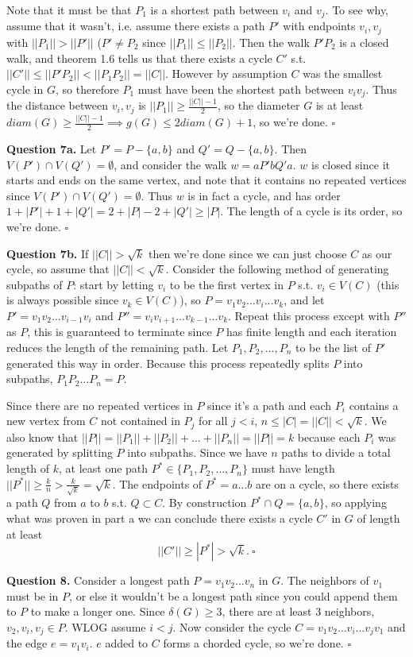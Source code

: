 \documentclass[letterpaper, reqno,11pt]{article}
\begin{document}
Note that it must be that $P_1$ is a shortest path between $v_i$ and $v_j$. To see why, assume that it wasn't, i.e. assume there exists a path $P'$ with endpoints $v_i, v_j$ with $| |P_1| |> | |P'| |$ ($P'\neq P_2$ since $| |P_1| |\leq | |P_2| |$. Then the walk $P'P_2$ is a closed walk, and theorem 1.6 tells us that there exists a cycle $C'$ s.t. $| |C'| |\leq | |P'P_2| |<| |P_1P_2| |=| |C| |$. However by assumption $C$ was the smallest cycle in $G$, so therefore $P_1$ must have been the shortest path between $v_iv_j$. Thus the distance between $v_i,v_j$ is $| |P_1| |\geq \frac{| |C| |-1}{2}$, so the diameter $G$ is at least $diam(G)\geq \frac{| |C| |-1}{2}\implies g(G)\leq 2diam(G)+1$, so we're done. $\square$

{\medskip\noindent\bf Question 7a.} Let $P'=P-\{a,b\} $ and $Q'=Q-\{a,b\} $. Then $V(P')\cap V(Q')=\emptyset$, and consider the walk $w=aP'bQ'a$. $w$ is closed since it starts and ends on the same vertex, and note that it contains no repeated vertices since $V(P')\cap V(Q')=\emptyset$. Thus $w$ is in fact a cycle, and has order $1 + |P'| + 1 + |Q'|=2 + |P|-2+|Q'|\geq |P| $. The length of a cycle is its order, so we're done. $\square$

{\medskip\noindent\bf Question 7b.} If $| |C| |> \sqrt{k} $ then we're done since we can just choose $C$ as our cycle, so assume that $| |C| |< \sqrt{k} $. Consider the following method of generating subpaths of $P$: start by letting $v_i$ to be the first vertex in $P$ s.t. $v_i\in V(C)$ (this is always possible since $v_k\in V(C)$), so $P=v_1v_2\ldots v_i\ldots v_k$, and let $P'=v_1v_2\ldots v_{i-1}v_{i}$ and $P''=v_{i}v_{i+1}\ldots v_{k-1}\ldots v_{k}$. Repeat this process except with $P''$ as $P$, this is guaranteed to terminate since $P$ has finite length and each iteration reduces the length of the remaining path. Let $P_1, P_2, \ldots, P_n$ to be the list of $P'$ generated this way in order. Because this process repeatedly splits $P$ into subpaths, $P_1P_2\ldots P_n=P$.

Since there are no repeated vertices in $P$ since it's a path and each $P_i$ contains a new vertex from $C$ not contained in $P_j$ for all $j<i$, $n\leq |C|=| |C| |< \sqrt{k} $. We also know that $| |P| |=|| P_1| |+| |P_2| |+\ldots+| |P_n| |=| |P| |=k$ because each $P_i$ was generated by splitting $P$ into subpaths. Since we have $n$ paths to divide a total length of $k$, at least one path $P^*\in \{P_1, P_2, \ldots, P_n\} $ must have length $||P^*| |\geq\frac{k}{n}> \frac{k}{\sqrt{k} }=\sqrt{k} $. The endpoints of $P^*=a\ldots b$ are on a cycle, so there exists a path $Q$ from $a$ to $b$ s.t. $Q\subset C$. By construction $P^*\cap Q=\{a,b\}$, so applying what was proven in part a we can conclude there exists a cycle $C'$ in $G$ of length at least 
\[
| |C'| |\geq |P^*|> \sqrt{k}. \ \square 
\]

{\medskip\noindent\bf Question 8.} Consider a longest path $P=v_1v_2\ldots v_n$ in $G$. The neighbors of $v_1$ must be in $P$, or else it wouldn't be a longest path since you could append them to $P$ to make a longer one. Since $\delta(G)\geq 3$, there are at least $3$ neighbors, $v_2, v_i, v_j\in P$. WLOG assume $i<j$. Now consider the cycle $C=v_1v_2\ldots v_i\ldots v_jv_1$ and the edge $e=v_1v_i$. $e$ added to $C$ forms a chorded cycle, so we're done. $\square$
\end{document}
